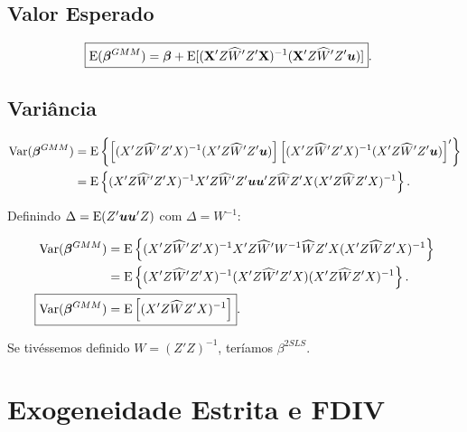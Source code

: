 \documentclass[11pt, oneside, a4paper, article]{article}
\numberwithin{equation}{section}
\begin{document}
\begin{description}
\subsection{Valor Esperado} 

\vspace{-1 em}
\begin{align*}
\Aboxed{
\E( \betavec^{GMM} ) &=
\betavec +
\E[ ( \Xmat' Z \widehat{W}' Z' \Xmat )^{-1} ( \Xmat' Z \widehat{W}' Z' \uvec ) ] }.
\end{align*}

\subsection{Variância} 

\vspace{-1 em}
\begin{align*}
\text{Var}( \boldsymbol{\beta}^{GMM} ) &=
\text{E} \left\{ 
\left[ ( X' Z \widehat{W}' Z' X )^{-1} ( X' Z \widehat{W}' Z' \boldsymbol{u} ) \right]
\left[ ( X' Z \widehat{W}' Z' X )^{-1} ( X' Z \widehat{W}' Z' \boldsymbol{u} ) \right]'
\right\}
\\ &=
\text{E} \left\{ 
( X' Z \widehat{W}' Z' X )^{-1}
X' Z \widehat{W}' Z' \boldsymbol{u} \boldsymbol{u}' Z \widehat{W} Z' X 
( X' Z \widehat{W} Z' X )^{-1}
\right\}.
\end{align*}

\noindent
Definindo $\Delta = \text{E}(Z' \boldsymbol{u}\boldsymbol{u}' Z)$ com $\Delta = W^{-1}$:

\vspace{-1 em}
\begin{align*}
\Var( \betavec^{GMM} ) &=
\E \left\{ 
( X' Z \widehat{W}' Z' X )^{-1}
X' Z \widehat{W}' W^{-1} \widehat{W} Z' X 
( X' Z \widehat{W} Z' X )^{-1}
\right\}
\\ &=
\E \left\{ 
( X' Z \widehat{W}' Z' X )^{-1}
( X' Z \widehat{W}' Z' X )
( X' Z \widehat{W} Z' X )^{-1}
\right\}.
\\
\Aboxed{
\Var( \betavec^{GMM} ) &=
\E \left[
( X' Z \widehat{W} Z' X )^{-1}
\right] }.
\end{align*}

\noindent
Se tivéssemos definido $W = (Z'Z)^{-1}$, teríamos $\beta^{2SLS}$.


\clearpage
\section{Exogeneidade Estrita e FDIV}



\end{description}
\end{document}
